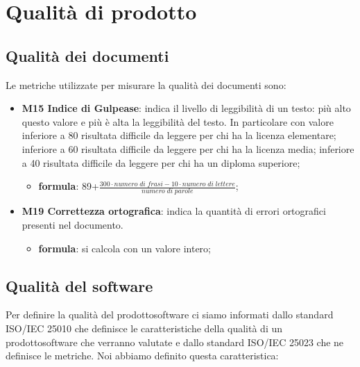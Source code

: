 \appendix
\section{Qualità di prodotto}
	\subsection{Qualità dei documenti}
	Le metriche utilizzate per misurare la qualità dei documenti sono:
	\begin{itemize}
		\item \textbf{M15 Indice di Gulpease}: indica il livello di leggibilità di un testo: più alto questo valore e più è alta la leggibilità del testo. In particolare con valore inferiore a 80 risultata difficile da leggere per chi ha la licenza elementare; inferiore a 60 risultata difficile da leggere per chi ha la licenza media; inferiore a 40 risultata difficile da leggere per chi ha un diploma superiore;
		\begin{itemize}
			\item[] \textbf{formula}: 89+$\frac{300\cdot numero \; di \; frasi-10\cdot numero \; di \; lettere}{numero \; di \; parole}$;
		\end{itemize}                	
		\item \textbf{M19 Correttezza ortografica}: indica la quantità di errori ortografici presenti nel documento.
		\begin{itemize}
			\item[] \textbf{formula}: si calcola con un valore intero;
		\end{itemize}
	\end{itemize}
	\subsection{Qualità del software} 
	Per definire la qualità del prodotto\glosp software ci siamo informati dallo standard ISO/IEC 25010 che definisce le caratteristiche della qualità di un prodotto\glosp software che verranno valutate e dallo standard ISO/IEC 25023 che ne definisce le metriche. Noi abbiamo definito questa caratteristica:
